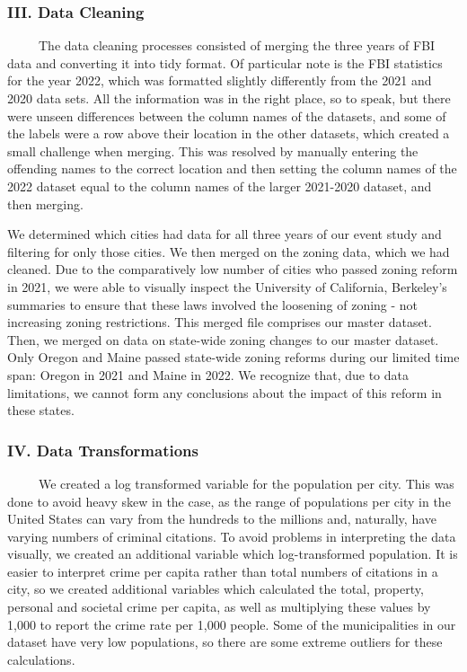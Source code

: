 \documentclass[
  12pt,
]{article}
\begin{document}
\hypertarget{iii.-data-cleaning}{%
\subsubsection{III. Data Cleaning}\label{iii.-data-cleaning}}

\setlength\parindent{24pt}

~~~~~The data cleaning processes consisted of merging the three years of
FBI data and converting it into tidy format. Of particular note is the
FBI statistics for the year 2022, which was formatted slightly
differently from the 2021 and 2020 data sets. All the information was in
the right place, so to speak, but there were unseen differences between
the column names of the datasets, and some of the labels were a row
above their location in the other datasets, which created a small
challenge when merging. This was resolved by manually entering the
offending names to the correct location and then setting the column
names of the 2022 dataset equal to the column names of the larger
2021-2020 dataset, and then merging.

We determined which cities had data for all three years of our event
study and filtering for only those cities. We then merged on the zoning
data, which we had cleaned. Due to the comparatively low number of
cities who passed zoning reform in 2021, we were able to visually
inspect the University of California, Berkeley's summaries to ensure
that these laws involved the loosening of zoning - not increasing zoning
restrictions. This merged file comprises our master dataset. Then, we
merged on data on state-wide zoning changes to our master dataset. Only
Oregon and Maine passed state-wide zoning reforms during our limited
time span: Oregon in 2021 and Maine in 2022. We recognize that, due to
data limitations, we cannot form any conclusions about the impact of
this reform in these states.

\hypertarget{iv.-data-transformations}{%
\subsubsection{IV. Data
Transformations}\label{iv.-data-transformations}}

\setlength\parindent{24pt}

~~~~~We created a log transformed variable for the population per city.
This was done to avoid heavy skew in the case, as the range of
populations per city in the United States can vary from the hundreds to
the millions and, naturally, have varying numbers of criminal citations.
To avoid problems in interpreting the data visually, we created an
additional variable which log-transformed population. It is easier to
interpret crime per capita rather than total numbers of citations in a
city, so we created additional variables which calculated the total,
property, personal and societal crime per capita, as well as multiplying
these values by 1,000 to report the crime rate per 1,000 people. Some of
the municipalities in our dataset have very low populations, so there
are some extreme outliers for these calculations.
\end{document}

